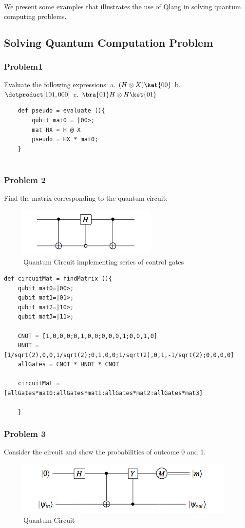 We present some examples that illustrates the use of Qlang in solving quantum computing problems.

\subsection { Solving Quantum Computation Problem}
\subsubsection{Problem1}
Evaluate the following expressions: a. $(H \otimes X) \ket{00}$ b. $\dotproduct[101,000]$ c. $\bra{01} H \otimes H \ket{01} $
\begin{lstlisting}
	def pseudo = evaluate (){
		qubit mat0 = |00>;
		mat HX = H @ X
		pseudo = HX * mat0;
	}
	
\end{lstlisting}

\subsubsection{Problem 2}
Find the matrix corresponding to the quantum circuit:
\begin{figure}[h!]
\begin{center}
\includegraphics{circuit1}
\end{center}
\caption{ Quantum Circuit implementing series of control gates
\label{cir1}}
\end{figure}

\begin{lstlisting}
def circuitMat = findMatrix (){
	qubit mat0=|00>;
	qubit mat1=|01>;
	qubit mat2=|10>;
	qubit mat3=|11>;
		
	CNOT = [1,0,0,0;0,1,0,0;0,0,0,1;0,0,1,0]
	HNOT = [1/sqrt(2),0,0,1/sqrt(2);0,1,0,0;1/sqrt(2),0,1,-1/sqrt(2);0,0,0,0]
	allGates = CNOT * HNOT * CNOT
		
	circuitMat =[allGates*mat0:allGates*mat1:allGates*mat2:allGates*mat3]
		
	}
\end{lstlisting}
\subsubsection{Problem 3}
Consider the circuit and show the probabilities of outcome 0 and 1.
\begin{figure}[h!]
\begin{center}
\includegraphics{circuit2}
\end{center}
\caption{ Quantum Circuit 
\label{cir1}}
\end{figure}


